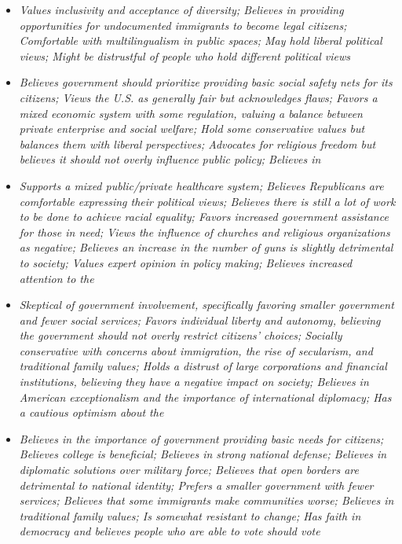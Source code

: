 \documentclass[11pt]{article}
\newcommand{\profiletext}[1]{\textit{#1}}
\begin{document}
\begin{itemize}
\item \profiletext{Values inclusivity and acceptance of diversity; Believes in providing opportunities for undocumented immigrants to become legal citizens; Comfortable with multilingualism in public spaces; May hold liberal political views; Might be distrustful of people who hold different political views}
\item \profiletext{Believes government should prioritize providing basic social safety nets for its citizens; Views the U.S. as generally fair but acknowledges flaws; Favors a mixed economic system with some regulation, valuing a balance between private enterprise and social welfare; Hold some conservative values but balances them with liberal perspectives; Advocates for religious freedom but believes it should not overly influence public policy; Believes in}
\item \profiletext{Supports a mixed public/private healthcare system; Believes Republicans are comfortable expressing their political views; Believes there is still a lot of work to be done to achieve racial equality; Favors increased government assistance for those in need; Views the influence of churches and religious organizations as negative; Believes an increase in the number of guns is slightly detrimental to society; Values expert opinion in policy making; Believes increased attention to the}
\item \profiletext{Skeptical of government involvement, specifically favoring smaller government and fewer social services; Favors individual liberty and autonomy, believing the government should not overly restrict citizens' choices; Socially conservative with concerns about immigration, the rise of secularism, and traditional family values; Holds a distrust of large corporations and financial institutions, believing they have a negative impact on society; Believes in American exceptionalism and the importance of international diplomacy; Has a cautious optimism about the}
\item \profiletext{Believes in the importance of government providing basic needs for citizens; Believes college is beneficial; Believes in strong national defense; Believes in diplomatic solutions over military force; Believes that open borders are detrimental to national identity; Prefers a smaller government with fewer services; Believes that some immigrants make communities worse; Believes in traditional family values; Is somewhat resistant to change; Has faith in democracy and believes people who are able to vote should vote}
\end{itemize}
\end{document}
